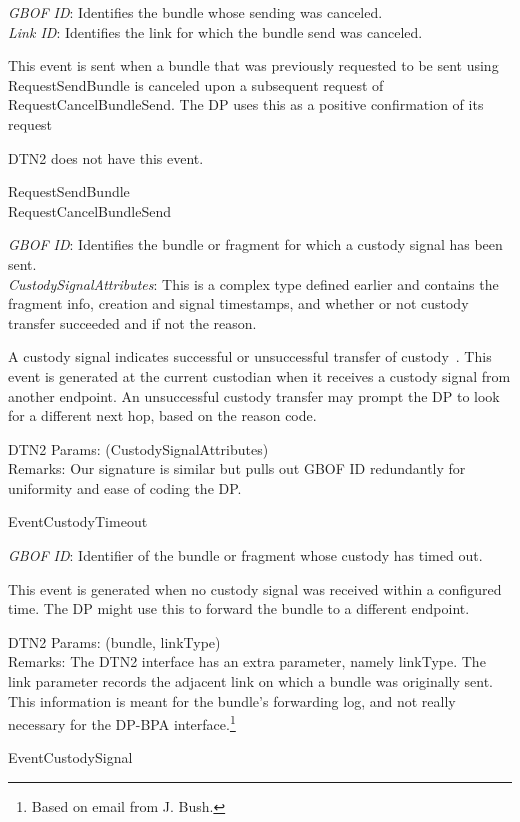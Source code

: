 {
\metP
    {\em GBOF ID}: Identifies the bundle whose sending was canceled.\\
    {\em Link ID}: Identifies the link for which the bundle send was
    canceled.

\metD
    This event is sent when a bundle that was previously requested to be 
    sent using RequestSendBundle is canceled upon a subsequent request of 
    RequestCancelBundleSend. The DP uses this as a positive confirmation of its
    request

\metM
    DTN2 does not have this event.

\metR
    RequestSendBundle\\
    RequestCancelBundleSend
}


{
\metP
    {\em GBOF ID}: Identifies the bundle or fragment for which a custody signal
    has been sent.\\
    {\em CustodySignalAttributes}: This is a complex type defined earlier and  
    contains the fragment info, creation and signal timestamps, and whether
    or not custody transfer succeeded and if not the reason.

\metD
    A custody signal indicates successful or unsuccessful transfer of
    custody~\cite{BP-ID}. This event is generated at the current custodian
    when it receives a custody signal from another endpoint. An unsuccessful
    custody transfer may prompt the DP to look for a different next hop,
    based on the reason code.

\metM
    DTN2 Params: (CustodySignalAttributes)\\
    Remarks: Our signature is similar but pulls out GBOF ID redundantly
    for uniformity and ease of coding the DP.

\metR
    EventCustodyTimeout
}


{
\metP
    {\em GBOF ID}: Identifier of the bundle or fragment whose custody has
    timed out.

\metD
    This event is generated when no custody signal was received within
    a configured time. The DP might use this to forward the bundle to
    a different endpoint.

\metM
    DTN2 Params: (bundle, linkType)\\
    Remarks: The DTN2 interface has an extra parameter, namely linkType. 
    The link parameter records the adjacent link on which a bundle was
    originally sent. This information is meant for the bundle's forwarding
    log, and not really necessary for the DP-BPA interface.\footnote{Based
    on email from J. Bush.}

\metR
    EventCustodySignal

}


